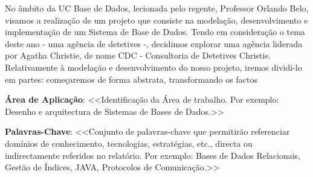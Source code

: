 \documentclass[a4paper,12pt]{scrreprt}
\begin{document}

\makecover



%     
%     






\renewenvironment{abstract}
 {\par\noindent\textbf{\Large\abstractname}\par\bigskip}
 {}

\begin{flushleft}
\begin{abstract}
    No âmbito da UC Base de Dados, lecionada pelo regente, Professor Orlando Belo, visamos a
    realização de um projeto que consiste na modelação, desenvolvimento e implementação de um
    Sistema de Base de Dados.
    Tendo em consideração o tema deste ano - uma agência de detetives -, decidimos explorar
    uma agência liderada por Agatha Christie, de nome CDC - Consultoria de Detetives Christie.
    Relativamente à modelação e desenvolvimento do nosso projeto, iremos dividi-lo em partes:
    começaremos de forma abstrata, transformando os factos
    \par \textbf{Área de Aplicação}: <<Identificação da Área de trabalho. Por exemplo: Desenho e arquitectura de Sistemas de Bases de Dados.>> 
    \par \textbf{Palavras-Chave}: <<Conjunto de palavras-chave que permitirão referenciar domínios de conhecimento, tecnologias, estratégias, etc., directa ou indirectamente referidos no relatório. Por exemplo: Bases de Dados Relacionais, Gestão de Índices, JAVA, Protocolos de Comunicação.>>
\end{abstract}
\end{flushleft}
\end{document}
